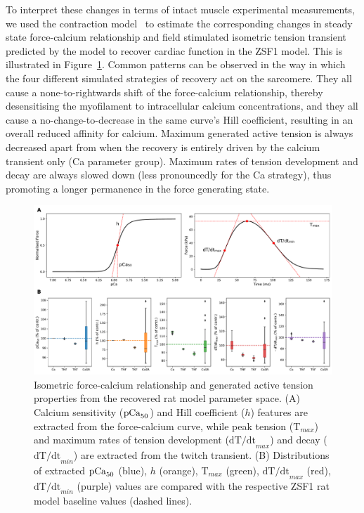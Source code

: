 \vspace{0.2cm}
To interpret these changes in terms of intact muscle experimental measurements, we used the contraction model~\cite{Land:2012*a} to estimate the corresponding changes in steady state force-calcium relationship and field stimulated isometric tension transient predicted by the model to recover cardiac function in the ZSF1 model. This is illustrated in Figure~\ref{fig:fpcatension}. Common patterns can be observed in the way in which the four different simulated strategies of recovery act on the sarcomere. They all cause a none-to-rightwards shift of the force-calcium relationship, thereby desensitising the myofilament to intracellular calcium concentrations, and they all cause a no-change-to-decrease in the same curve's Hill coefficient, resulting in an overall reduced affinity for calcium. Maximum generated active tension is always decreased apart from when the recovery is entirely driven by the calcium transient only (Ca parameter group). Maximum rates of tension development and decay are always slowed down (less pronouncedly for the Ca strategy), thus promoting a longer permanence in the force generating state. 

\begin{figure}[!ht]
    \myfloatalign
    \includegraphics[width=\textwidth]{figures/chapter07/FpCa_T_trends_explained.pdf}
    \caption{Isometric force-calcium relationship and generated active tension properties from the recovered rat model parameter space. (A) Calcium sensitivity ($\textrm{pCa}_{50}$) and Hill coefficient ($h$) features are extracted from the force-calcium curve, while peak tension ($\textrm{T}_{max}$) and maximum rates of tension development ($\textrm{dT/dt}_{max}$) and decay ($\textrm{dT/dt}_{min}$) are extracted from the twitch transient. (B) Distributions of extracted $\textrm{pCa}_{50}$ (blue), $h$ (orange), $\textrm{T}_{max}$ (green), $\textrm{dT/dt}_{max}$ (red), $\textrm{dT/dt}_{min}$ (purple) values are compared with the respective ZSF1 rat model baseline values (dashed lines).}
    \label{fig:fpcatension}
\end{figure}


